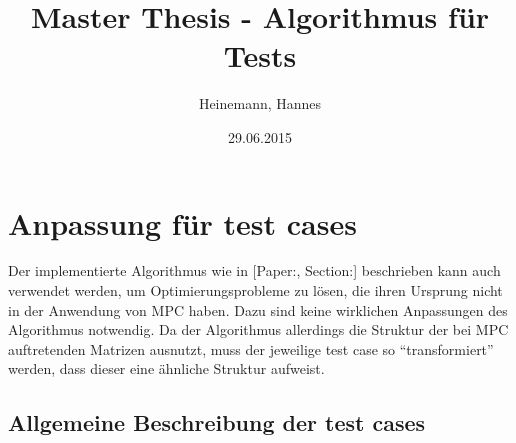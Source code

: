 \documentclass[a4paper,10pt]{scrartcl}
\title{Master Thesis - Algorithmus für Tests}
\author{Heinemann, Hannes}
\date{29.06.2015}
\begin{document}
\maketitle
\section{Anpassung für test cases}
\label{sec:testcases}
Der implementierte Algorithmus wie in [Paper:, Section:] beschrieben kann auch verwendet werden, um Optimierungsprobleme zu lösen, die ihren Ursprung nicht in der Anwendung von MPC haben. Dazu sind keine wirklichen Anpassungen des Algorithmus notwendig. Da der Algorithmus allerdings die Struktur der bei MPC auftretenden Matrizen ausnutzt, muss der jeweilige test case so ``transformiert'' werden, dass dieser eine ähnliche Struktur aufweist.
\subsection{Allgemeine Beschreibung der test cases}
\label{sec:beschreibungtestcases}
\end{document}
